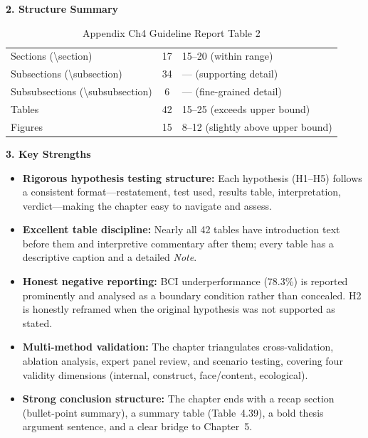 \noindent\textbf{\color{ggunavy}2. Structure Summary}

\begin{table}[H]
\tablefontsize
\caption{Appendix Ch4 Guideline Report Table 2}
\tablestripes
\begin{tabularx}{\textwidth}{@{} l c L @{}}
\toprule
{} &  &  \\
\midrule
Sections (\textbackslash section) & 17 & 15--20 (within range) \\
Subsections (\textbackslash subsection) & 34 & --- (supporting detail) \\
Subsubsections (\textbackslash subsubsection) & 6 & --- (fine-grained detail) \\
Tables & 42 & 15--25 (exceeds upper bound) \\
Figures & 15 & 8--12 (slightly above upper bound) \\
\bottomrule
\end{tabularx}
\end{table}

\noindent\textbf{\color{ggunavy}3. Key Strengths}

\begin{itemize}[nosep]
\item \textbf{Rigorous hypothesis testing structure:} Each hypothesis (H1--H5) follows a consistent format---restatement, test used, results table, interpretation, verdict---making the chapter easy to navigate and assess.
\item \textbf{Excellent table discipline:} Nearly all 42 tables have introduction text before them and interpretive commentary after them; every table has a descriptive caption and a detailed \textit{Note}.
\item \textbf{Honest negative reporting:} BCI underperformance (78.3\%) is reported prominently and analysed as a boundary condition rather than concealed. H2 is honestly reframed when the original hypothesis was not supported as stated.
\item \textbf{Multi-method validation:} The chapter triangulates cross-validation, ablation analysis, expert panel review, and scenario testing, covering four validity dimensions (internal, construct, face/content, ecological).
\item \textbf{Strong conclusion structure:} The chapter ends with a recap section (bullet-point summary), a summary table (Table~4.39), a bold thesis argument sentence, and a clear bridge to Chapter~5.
\end{itemize}

